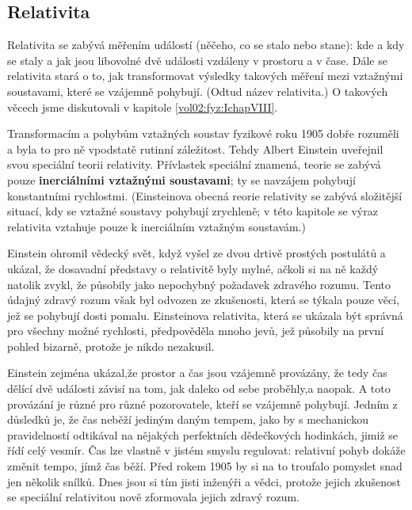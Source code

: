       \subsection{Relativita}
        Relativita se zabývá měřením událostí (něčeho, co se stalo nebo stane): kde a kdy se staly a
        jak jsou libovolné dvě události vzdáleny v prostoru a v čase. Dále se relativita stará o to,
        jak transformovat výsledky takových měření mezi vztažnými soustavami, které se vzájemně
        pohybují. (Odtud název relativita.) O takových věcech jsme diskutovali v kapitole
        \ref{vol02:fyz:IchapVIII}.

        Transformacím a pohybům vztažných soustav fyzikové roku 1905 dobře rozuměli a byla to pro ně
        vpodstatě rutinní záležitost. Tehdy Albert Einstein uveřejnil svou speciální teorii
        relativity. Přívlastek speciální znamená, teorie se zabývá pouze \textbf{inerciálními
        vztažnými soustavami}; ty se navzájem pohybují konstantními rychlostmi. (Einsteinova obecná
        reorie relativity se zabývá složitější situací, kdy se vztažné soustavy pohybují zrychleně;
        v této kapitole se výraz relativita vztahuje pouze k inerciálním vztažným soustavám.)
        
        Einstein ohromil vědecký svět, když vyšel ze dvou drtivě prostých postulátů a ukázal, že
        dosavadní představy o relativitě byly mylné, ačkoli si na ně každý natolik zvykl, že
        působily jako nepochybný požadavek zdravého rozumu. Tento údajný zdravý rozum však byl
        odvozen ze zkušenosti, která se týkala pouze věcí, jež se pohybují dosti pomalu. Einsteinova
        relativita, která se ukázala být správná pro všechny možné rychlosti, předpověděla mnoho
        jevů, jež působily na první pohled bizarně, protože je nikdo nezakusil.

        Einstein zejména ukázal,že prostor a čas jsou vzájemně provázány, že tedy čas dělící dvě
        události závisí na tom, jak daleko od sebe proběhly,a naopak. A toto provázání je různé pro
        různé pozorovatele, kteří se vzájemně pohybují. Jedním z důsledků je, že čas neběží jediným
        daným tempem, jako by s mechanickou pravidelností odtikával na nějakých perfektních
        dědečkových hodinkách, jimiž se řídí celý vesmír. Čas lze vlastně v jistém smyslu regulovat:
        relativní pohyb dokáže změnit tempo, jímž čas běží. Před rokem 1905 by si na to troufalo
        pomyslet snad jen několik snílků. Dnes jsou si tím jisti inženýři a vědci, protože jejich
        zkušenost se speciální relativitou nově zformovala jejich zdravý rozum.
      

